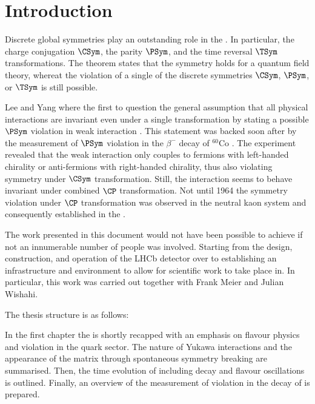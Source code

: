 
\chapter{Introduction}
\label{ch:introduction}

Discrete global symmetries play an outstanding role in the \SM. In particular,
the charge conjugation $\CSym$, the parity $\PSym$, and the time reversal
$\TSym$ transformations. The \CPT theorem \cite{set:cpt} states that the \CPT
symmetry holds for a quantum field theory, whereat the violation of a single of
the discrete symmetries $\CSym$, $\PSym$, or $\TSym$ is still possible.

Lee and Yang where the first to question the general assumption that all
physical interactions are invariant even under a single transformation by
stating a possible $\PSym$ violation in weak interaction \cite{Lee:1956qn}. This
statement was backed soon after by the measurement of $\PSym$ violation in the
$\beta^{-}$ decay of ${}^{60}\text{Co}$ \cite{Wu:1957my}. The experiment
revealed that the weak interaction only couples to fermions with left-handed
chirality or anti-fermions with right-handed chirality, thus also violating
symmetry under $\CSym$ transformation. Still, the interaction seems to behave
invariant under combined $\CP$ transformation. Not until 1964 the symmetry
violation under $\CP$ transformation was observed in the neutral kaon system
\cite{Christenson:1964fg} and consequently established in the \SM.

The work presented in this document would not have been possible to achieve if
not an innumerable number of people was involved. Starting from the design,
construction, and operation of the \acs{LHCb} detector over to establishing an
infrastructure and environment to allow for scientific work to take place in. In
particular, this work was carried out together with Frank Meier and Julian
Wishahi.

\par
The thesis structure is as follows:

In the first chapter the \SM is shortly recapped with an emphasis on flavour
physics and \CP violation in the quark sector. The nature of Yukawa
interactions and the appearance of the \CKM matrix through spontaneous symmetry
breaking are summarised. Then, the time evolution of \Bmesons including decay
and flavour oscillations is outlined. Finally, an overview of the measurement of
\CP violation in the decay of \BdToJpsiKS is prepared.

